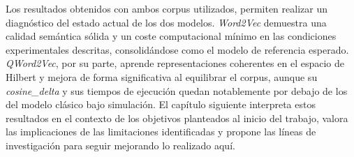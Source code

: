 Los resultados obtenidos con ambos corpus utilizados, permiten realizar un diagnóstico del estado actual de los dos modelos. \textit{Word2Vec} demuestra una calidad semántica sólida y un coste computacional mínimo en las condiciones experimentales descritas, consolidándose como el modelo de referencia esperado. \textit{QWord2Vec}, por su parte, aprende representaciones coherentes en el espacio de Hilbert y mejora de forma significativa al equilibrar el corpus, aunque su \textit{cosine\_delta} y sus tiempos de ejecución quedan notablemente por debajo de los del modelo clásico bajo simulación. El capítulo siguiente interpreta estos resultados en el contexto de los objetivos planteados al inicio del trabajo, valora las implicaciones de las limitaciones identificadas y propone las líneas de investigación para seguir mejorando lo realizado aquí.
